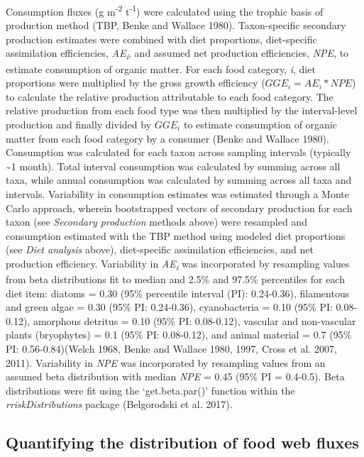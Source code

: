 \documentclass[
]{article}
\begin{document}
Consumption fluxes (g m\textsuperscript{-2} t\textsuperscript{-1}) were
calculated using the trophic basis of production method (TBP, Benke and
Wallace 1980). Taxon-specific secondary production estimates were
combined with diet proportions, diet-specific assimilation efficiencies,
\emph{AE\textsubscript{i}}, and assumed net production efficiencies,
\emph{NPE}, to estimate consumption of organic matter. For each food
category, \emph{i}, diet proportions were multiplied by the gross growth
efficiency (\(GGE_{i} = AE_{i} * NPE\)) to calculate the relative
production attributable to each food category. The relative production
from each food type was then multiplied by the interval-level production
and finally divided by \(GGE_{i}\) to estimate consumption of organic
matter from each food category by a consumer (Benke and Wallace 1980).
Consumption was calculated for each taxon across sampling intervals
(typically \textasciitilde1 month). Total interval consumption was
calculated by summing across all taxa, while annual consumption was
calculated by summing across all taxa and intervals. Variability in
consumption estimates was estimated through a Monte Carlo approach,
wherein bootstrapped vectors of secondary production for each taxon (see
\emph{Secondary production} methods above) were resampled and
consumption estimated with the TBP method using modeled diet proportions
(see \emph{Diet analysis} above), diet-specific assimilation
efficiencies, and net production efficiency. Variability in
\emph{AE\textsubscript{i}} was incorporated by resampling values from
beta distributions fit to median and 2.5\% and 97.5\% percentiles for
each diet item: diatoms = 0.30 (95\% percentile interval (PI):
0.24-0.36), filamentous and green algae = 0.30 (95\% PI: 0.24-0.36),
cyanobacteria = 0.10 (95\% PI: 0.08-0.12), amorphous detritus = 0.10
(95\% PI: 0.08-0.12), vascular and non-vascular plants (bryophytes) =
0.1 (95\% PI: 0.08-0.12), and animal material = 0.7 (95\% PI:
0.56-0.84)(Welch 1968, Benke and Wallace 1980, 1997, Cross et al. 2007,
2011). Variability in \emph{NPE} was incorporated by resampling values
from an assumed beta distribution with median \emph{NPE} = 0.45 (95\% PI
= 0.4-0.5). Beta distributions were fit using the `get.beta.par()'
function within the \emph{rriskDistributions} package (Belgorodski et
al. 2017).

\hypertarget{quantifying-the-distribution-of-food-web-fluxes}{%
\subsection{Quantifying the distribution of food web
fluxes}\label{quantifying-the-distribution-of-food-web-fluxes}}
\end{document}

